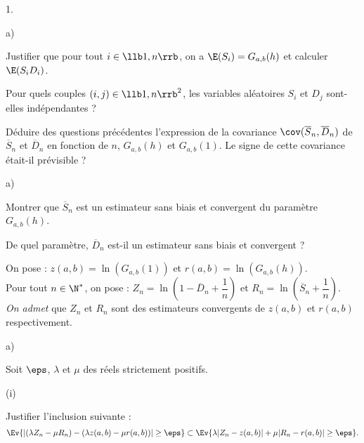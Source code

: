 \begin{noliste}{1.}
  \setcounter{enumi}{9}
\item 
  \begin{noliste}{a)}
    \setlength{\itemsep}{2mm}
  \item Justifier que pour tout $i\in\llb 1,n\rrb$, on a $\E(S_i) =
    G_{a,b}(h)$ et calculer $\E(S_iD_i)$.

    

  \item Pour quels couples $(i,j) \in \llb 1,n\rrb^2$, les variables
    aléatoires $S_i$ et $D_j$ sont-elles indépendantes ?

    

  \item Déduire des questions précédentes l'expression de la
    covariance $\cov(\overline{S}_n, \overline{D}_n)$ de
    $\overline{S}_n$ et $\overline{D}_n$ en fonction de $n$,
    $G_{a,b}(h)$ et $G_{a,b}(1)$. Le signe de cette covariance
    était-il prévisible ?

    
  \end{noliste}

\item
  \begin{noliste}{a)}
    \setlength{\itemsep}{2mm}
  \item Montrer que $\overline{S}_n$ est un estimateur sans biais et
    convergent du paramètre $G_{a,b}(h)$.

    

  \item De quel paramètre, $\overline{D}_n$ est-il un estimateur sans
    biais et convergent ?
    
    
  \end{noliste}
  

  
  
  
  


\item On pose : $z(a,b)=\ln(G_{a,b}(1))$ et $r(a,b)=\ln(G_{a,b}(h))$.\\
  Pour tout $n\in\N^*$, on pose : $Z_n = \ln\left(1-\overline{D}_n
    +\dfrac{1}{n}\right)$ et $R_n =
  \ln\left(\overline{S}_n+\dfrac{1}{n}\right)$.\\
  {\it On admet} que $Z_n$ et $R_n$ sont des estimateurs convergents
  de $z(a,b)$ et $r(a,b)$ respectivement.
  \begin{noliste}{a)}
    \setlength{\itemsep}{2mm}
  \item Soit $\eps$, $\lambda$ et $\mu$ des réels strictement
    positifs.
    \begin{noliste}{(i)}
    \item Justifier l'inclusion suivante :
      \[
      \Ev{ \left\vert (\lambda Z_n-\mu R_n) - (\lambda z(a,b) -\mu
          r(a,b))\right\vert \geq \eps} \subset \Ev{\lambda
        \vert Z_n - z(a,b)\vert + \mu \vert R_n-r(a,b)\vert \geq
        \eps}.
      \]
      

\end{noliste}
\end{noliste}
\end{noliste}

